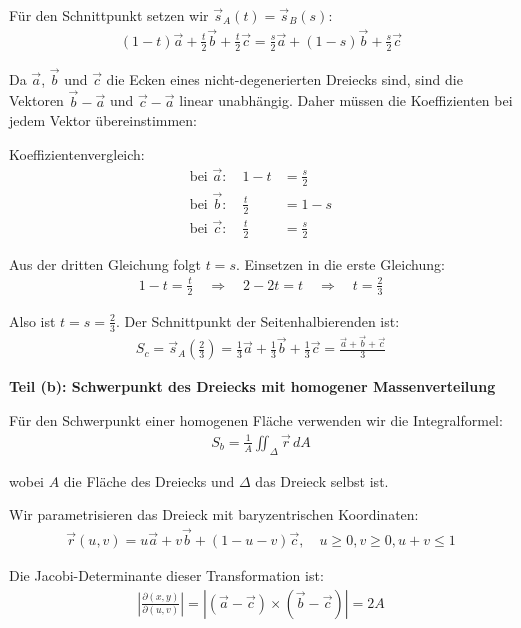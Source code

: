 \documentclass{article}
\begin{document}
Für den Schnittpunkt setzen wir $\vec{s}_A(t) = \vec{s}_B(s)$:
\begin{align}
(1-t)\vec{a} + \frac{t}{2}\vec{b} + \frac{t}{2}\vec{c} = \frac{s}{2}\vec{a} + (1-s)\vec{b} + \frac{s}{2}\vec{c}
\end{align}

Da $\vec{a}$, $\vec{b}$ und $\vec{c}$ die Ecken eines nicht-degenerierten Dreiecks sind, sind die Vektoren $\vec{b} - \vec{a}$ und $\vec{c} - \vec{a}$ linear unabhängig. Daher müssen die Koeffizienten bei jedem Vektor übereinstimmen:

Koeffizientenvergleich:
\begin{align}
\text{bei } \vec{a}: \quad 1-t &= \frac{s}{2}\\
\text{bei } \vec{b}: \quad \frac{t}{2} &= 1-s\\
\text{bei } \vec{c}: \quad \frac{t}{2} &= \frac{s}{2}
\end{align}

Aus der dritten Gleichung folgt $t = s$. Einsetzen in die erste Gleichung:
\begin{align}
1-t = \frac{t}{2} \quad \Rightarrow \quad 2-2t = t \quad \Rightarrow \quad t = \frac{2}{3}
\end{align}

Also ist $t = s = \frac{2}{3}$. Der Schnittpunkt der Seitenhalbierenden ist:
\begin{align}
S_c = \vec{s}_A\left(\frac{2}{3}\right) = \frac{1}{3}\vec{a} + \frac{1}{3}\vec{b} + \frac{1}{3}\vec{c} = \frac{\vec{a} + \vec{b} + \vec{c}}{3}
\end{align}

\textbf{Teil (b): Schwerpunkt des Dreiecks mit homogener Massenverteilung}

Für den Schwerpunkt einer homogenen Fläche verwenden wir die Integralformel:
\begin{align}
S_b = \frac{1}{A} \iint_{\Delta} \vec{r} \, dA
\end{align}

wobei $A$ die Fläche des Dreiecks und $\Delta$ das Dreieck selbst ist.

Wir parametrisieren das Dreieck mit baryzentrischen Koordinaten:
\begin{align}
\vec{r}(u,v) = u\vec{a} + v\vec{b} + (1-u-v)\vec{c}, \quad u \geq 0, v \geq 0, u+v \leq 1
\end{align}

Die Jacobi-Determinante dieser Transformation ist:
\begin{align}
\left|\frac{\partial(x,y)}{\partial(u,v)}\right| = \left|(\vec{a} - \vec{c}) \times (\vec{b} - \vec{c})\right| = 2A
\end{align}
\end{document}
